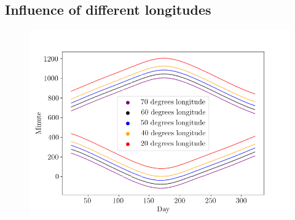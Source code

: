 





\newpage

\subsection{Influence of different longitudes}
\label{section_different_longitudes}

\begin{figure}[ht!]
\centering
\includegraphics[width=1\linewidth]{pics/poa_var_lon}
\label{fig-poa_var_lon2}
\end{figure}

